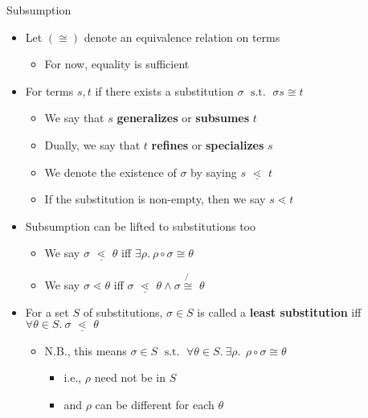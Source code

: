 \documentclass[pdf,fyma2]{prosper} %
\newcommand{\opr}[1]{\ensuremath{\operatorname{#1}}}
\newcommand{\isom}{\ensuremath{\cong}}
\newcommand{\notisom}{\ensuremath{\!\not{\!\!\isom\,}\,}}
\newcommand{\subsume}{\ensuremath{\lessdot}}
\newcommand{\subsumeq}{\ensuremath{\,\,\underline{\!\subsume\!}\,\,}}
\newcommand{\defn}[1]{\textbf{#1}}
\begin{document}
\begin{slide}{Subsumption}
	\begin{itemize}
	\item Let $(\isom)$ denote an equivalence relation on terms
    	\begin{itemize}
    	\item For now, equality is sufficient
    	\end{itemize}
	\item For terms $s,t$ if there exists a substitution $\sigma \opr{~s.t.~} \sigma s \isom t$
    	\begin{itemize}
	    \item We say that $s$ \defn{generalizes} or \defn{subsumes} $t$
	    \item Dually, we say that $t$ \defn{refines} or \defn{specializes} $s$
	    \item We denote the existence of $\sigma$ by saying $s \subsumeq t$
    	\item If the substitution is non-empty, then we say $s \subsume t$
    	\end{itemize}
    \item Subsumption can be lifted to substitutions too
    	\begin{itemize}
    	\item We say $\sigma \subsumeq \theta$ iff $\exists \rho.~ \rho\circ\sigma \isom \theta$
    	\item We say $\sigma \subsume \theta$ iff $\sigma \subsumeq \theta \land \sigma \notisom \theta$
    	\end{itemize}
    \item For a set $S$ of substitutions, $\sigma\in S$ is called a \defn{least substitution} iff $\forall \theta\in S.~ \sigma \subsumeq \theta$
    	\begin{itemize}
    	\item N.B., this means $\sigma\in S \opr{~s.t.~} \forall \theta\in S.~ \exists \rho.~~ \rho\circ\sigma \isom \theta$
            \begin{itemize}
            \item i.e., $\rho$ need not be in $S$
            \item and $\rho$ can be different for each $\theta$
            \end{itemize}
    	\end{itemize}
	\end{itemize}
\end{slide}
\end{document}
